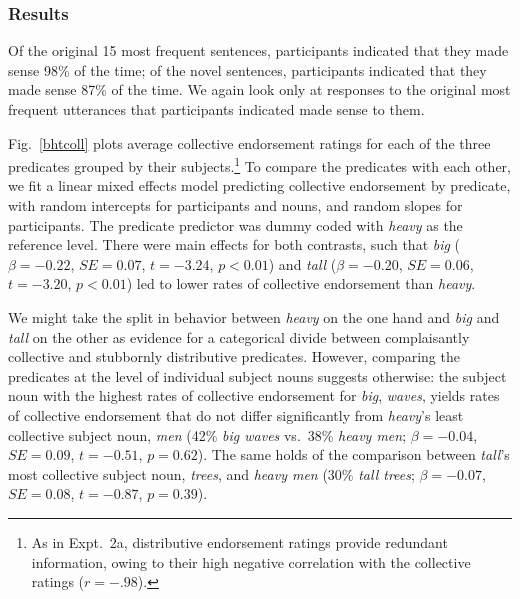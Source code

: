 \documentclass[preprint,12pt,authoryear,titlepage]{elsarticle}
\newcommand{\ndg}[1]{\textcolor{Green}{[ndg: #1]}}
\begin{document}
\subsubsection{Results}

Of the original 15 most frequent sentences, participants indicated that they made sense 98\% of the time; of the novel sentences, participants indicated that they made sense 87\% of the time.
We again look only at responses to the original most frequent utterances that participants indicated made sense to them.


Fig.~\ref{bhtcoll} plots average collective endorsement ratings for each of the three predicates grouped by their subjects.\footnote{As in Expt.~2a, distributive endorsement ratings provide redundant information, owing to their high negative correlation with the collective ratings ($r=-.98$).}
%
%
To compare the predicates with each other, we fit a linear mixed effects model predicting collective endorsement by predicate, with random intercepts for participants and nouns, and random slopes for participants. The predicate predictor was dummy coded with \emph{heavy} as the reference level. There were main effects for both contrasts, such that \emph{big} ($\beta=-0.22$, $SE=0.07$, $t=-3.24$, $p<0.01$) and \emph{tall} ($\beta=-0.20$, $SE=0.06$, $t=-3.20$, $p<0.01$) led to lower rates of collective endorsement than \emph{heavy}. 

We might take the split in behavior between \emph{heavy} on the one hand and \emph{big} and \emph{tall} on the other as evidence for a categorical divide between complaisantly collective and stubbornly distributive predicates. However, comparing the predicates at the level of individual subject nouns suggests otherwise: the subject noun with the highest rates of collective endorsement for \emph{big}, \emph{waves}, yields rates of collective endorsement that do not differ significantly from \emph{heavy}'s least collective subject noun, \emph{men} (42\% \emph{big waves} vs.~38\% \emph{heavy men}; $\beta=-0.04$, $SE=0.09$, $t=-0.51$, $p=0.62$). The same holds of the comparison between \emph{tall}'s most collective subject noun, \emph{trees}, and \emph{heavy men} (30\% \emph{tall trees}; $\beta=-0.07$, $SE=0.08$, $t=-0.87$, $p=0.39$). 
\end{document}
